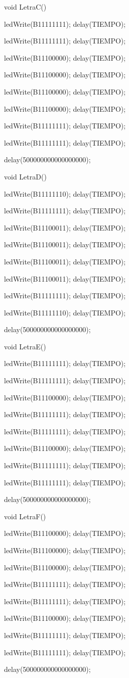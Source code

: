 \documentclass{article}
\begin{document}
void LetraC(){
   
   ledWrite(B11111111); delay(TIEMPO);
   
   ledWrite(B11111111); delay(TIEMPO);
   
   ledWrite(B11100000); delay(TIEMPO);
   
   ledWrite(B11100000); delay(TIEMPO);
   
   ledWrite(B11100000); delay(TIEMPO);
   
   ledWrite(B11100000); delay(TIEMPO);
   
   ledWrite(B11111111); delay(TIEMPO);
   
   ledWrite(B11111111); delay(TIEMPO);
  
  delay(500000000000000000);}

void LetraD(){
   
   ledWrite(B11111110); delay(TIEMPO);
   
   ledWrite(B11111111); delay(TIEMPO);
   
   ledWrite(B11100011); delay(TIEMPO);
   
   ledWrite(B11100011); delay(TIEMPO);
   
   ledWrite(B11100011); delay(TIEMPO);
   
   ledWrite(B11100011); delay(TIEMPO);
   
   ledWrite(B11111111); delay(TIEMPO);
   
   ledWrite(B11111110); delay(TIEMPO);
   
   delay(500000000000000000);}

void LetraE(){
   
   ledWrite(B11111111); delay(TIEMPO);
   
   ledWrite(B11111111); delay(TIEMPO);
   
   ledWrite(B11100000); delay(TIEMPO);
   
   ledWrite(B11111111); delay(TIEMPO);
   
   ledWrite(B11111111); delay(TIEMPO);
   
   ledWrite(B11100000); delay(TIEMPO);
   
   ledWrite(B11111111); delay(TIEMPO);
   
   ledWrite(B11111111); delay(TIEMPO);
   
   delay(500000000000000000);}

void LetraF(){
   
   ledWrite(B11100000); delay(TIEMPO);
   
   ledWrite(B11100000); delay(TIEMPO);
   
   ledWrite(B11100000); delay(TIEMPO);
   
   ledWrite(B11111111); delay(TIEMPO);
   
   ledWrite(B11111111); delay(TIEMPO);
   
   ledWrite(B11100000); delay(TIEMPO);
   
   ledWrite(B11111111); delay(TIEMPO);
   
   ledWrite(B11111111); delay(TIEMPO);
   
   delay(500000000000000000);}
\end{document}
